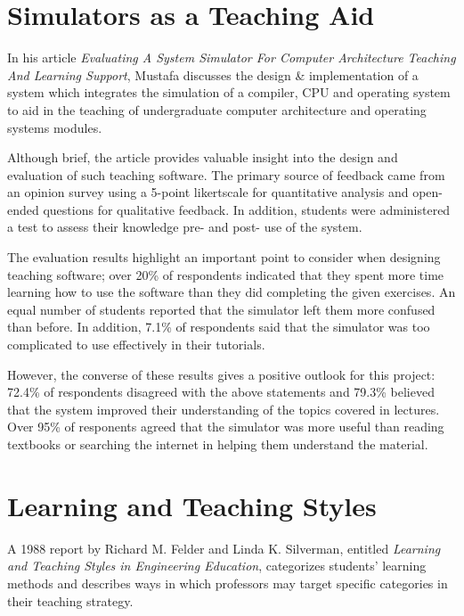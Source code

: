 \documentclass[bsc,twoside,singlespacing,parskip,logo,notimes,normalheadings]{infthesis}
\begin{document}
    \section{Simulators as a Teaching Aid}\label{sec:mustafa-simulator}

    In his article {\em Evaluating A System Simulator For Computer
      Architecture Teaching And Learning Support}\cite{mustafa2010},
    Mustafa discusses the design \& implementation of a system
    which integrates the simulation of a compiler, CPU and operating
    system to aid in the teaching of undergraduate computer
    architecture and operating systems modules.

    Although brief, the article provides valuable insight into the
    design and evaluation of such teaching software. The primary
    source of feedback came from an opinion survey using a 5-point
    \gls{likertscale} for quantitative analysis and open-ended questions
    for qualitative feedback. In addition, students were administered
    a test to assess their knowledge pre- and post- use of the system.

    The evaluation results highlight an important point to consider
    when designing teaching software; over 20\% of respondents
    indicated that they spent more time learning how to use the
    software than they did completing the given exercises. An equal
    number of students reported that the simulator left them more
    confused than before. In addition, 7.1\% of respondents said that
    the simulator was too complicated to use effectively in their
    tutorials.

    However, the converse of these results gives a positive outlook
    for this project: 72.4\% of respondents disagreed with the above
    statements and 79.3\% believed that the system improved their
    understanding of the topics covered in lectures. Over 95\% of
    responents agreed that the simulator was more useful than reading
    textbooks or searching the internet in helping them understand the
    material.

    \section{Learning and Teaching Styles}

    A 1988 report by Richard M. Felder and Linda K. Silverman,
    entitled {\em Learning and Teaching Styles in Engineering
      Education}\cite{felder1988}, categorizes students' learning
    methods and describes ways in which professors may target specific
    categories in their teaching strategy.
\end{document}
